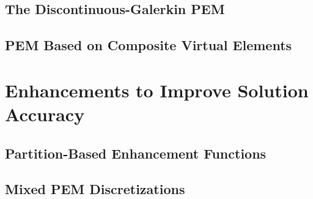 
\subsection{The Discontinuous-Galerkin PEM}

	
\subsection{PEM Based on Composite Virtual Elements}


\section{Enhancements to Improve Solution Accuracy}


\subsection{Partition-Based Enhancement Functions}
\subsection{Mixed PEM Discretizations}
